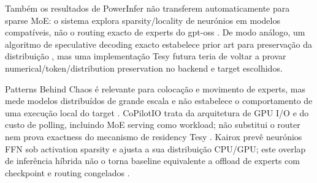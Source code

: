 Também os resultados de PowerInfer não transferem automaticamente para sparse MoE: o sistema explora sparsity/locality de neurónios em modelos compatíveis, não o routing exacto de experts do gpt-oss \cite{song2024powerinfer}. De modo análogo, um algoritmo de speculative decoding exacto estabelece prior art para preservação da distribuição \cite{leviathan2023speculative}, mas uma implementação Tesy futura teria de voltar a provar numerical/token/distribution preservation no backend e target escolhidos.

Patterns Behind Chaos é relevante para colocação e movimento de experts, mas mede modelos distribuídos de grande escala e não estabelece o comportamento de uma execução local do target \cite{yu2026patterns}. CoPilotIO trata da arquitetura de GPU I/O e do custo de polling, incluindo MoE serving como workload; não substitui o router nem prova exactness do mecanismo de residency Tesy \cite{chen2026copilotio}. Kairox prevê neurónios FFN sob activation sparsity e ajusta a sua distribuição CPU/GPU; este overlap de inferência híbrida não o torna baseline equivalente a offload de experts com checkpoint e routing congelados \cite{jiang2026kairox}.
